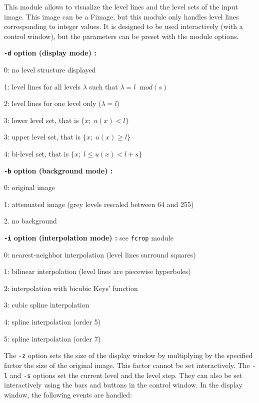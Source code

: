 This module allows to visualize the level lines 
 and the level sets 
 of
the input image. This image can be a Fimage, but this module only handles 
level lines corresponding to integer values.
It is designed to be used interactively (with a control
window), but the parameters can be preset with the module options.

\medskip

{\bf \verb+-d+ option (display mode) :}

0: no level structure displayed

1: level lines for all levels $\lambda$ such that $\lambda = l \;\;{\mathrm mod}(s)$

2: level lines for one level only ($\lambda=l$)

3: lower level set, that is $\{x;\; u(x)<l\}$

3: upper level set, that is $\{x;\; u(x)\geq l\}$

4: bi-level set, that is $\{x;\; l \leq u(x)<l+s\}$

\medskip

{\bf \verb+-b+ option (background mode) :}

0: original image

1: attenuated image (grey levels rescaled between 64 and 255)

2. no background

\medskip

{\bf \verb+-i+ option (interpolation mode) :} see \verb+fcrop+ module


0: nearest-neighbor interpolation (level lines surround squares)

1: bilinear interpolation (level lines are piecewise hyperboles)

2: interpolation with bicubic Keys' function 

3: cubic spline interpolation

4: spline interpolation (order 5)

5: spline interpolation (order 7)

\medskip

The \verb+-z+ option sets the size of the display window by multiplying
by the specified factor the size of the original image. This factor
cannot be set interactively. The \verb+-l+ and \verb+-s+ options 
set the current level and the level step. They can also be set interactively
using the bars and buttons in the control window. In the display window,
the following events are handled:

